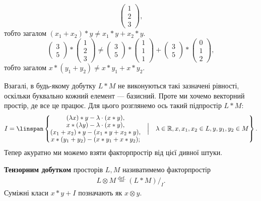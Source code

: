 \documentclass{math_library}
\begin{document}
\begin{example}
\[\begin{pmatrix}
1 \\ 2 \\ 3
\end{pmatrix},
\]
тобто загалом $(x_1+x_2)*y \neq x_1*y + x_2*y$.
\[
\begin{pmatrix}
3 \\ 5
\end{pmatrix} * \begin{pmatrix}
1 \\ 2 \\ 3
\end{pmatrix} \neq \begin{pmatrix}
3 \\ 5
\end{pmatrix} * \begin{pmatrix}
1 \\ 1 \\ 1
\end{pmatrix} + \begin{pmatrix}
3 \\ 5
\end{pmatrix} * \begin{pmatrix}
0 \\ 1 \\ 2
\end{pmatrix},
\]
тобто загалом $x*(y_1+y_2) \neq x*y_1 + x*y_2$.
\end{example}
\noindent
Взагалі, в будь-якому добутку $L*M$ не виконуються такі зазначені рівності, оскільки буквально кожний елемент --- базисний. Проте ми хочемо векторний простір, де все це працює. Для цього розглянемо ось такий підпростір $L*M$:
\begin{align*}
I = \linspan\left\{ \substack{ \textstyle (\lambda x)*y - \lambda \cdot (x*y), \\ \textstyle x*(\lambda y) - \lambda \cdot (x*y), \\ \textstyle (x_1+x_2)*y - (x_1*y + x_2*y), \\ \textstyle x*(y_1+y_2) - (x*y_1 + x*y_2); } \quad \Big| \quad \lambda \in \mathbb{R}, x,x_1,x_2 \in L, y,y_1,y_2 \in M  \right\}.
\end{align*}
Тепер акуратно ми можемо взяти факторпростір від цієї дивної штуки.

\begin{definition}
\textbf{Тензорним добутком} просторів $L,M$ називатимемо факторпростір
\begin{align*}
L \otimes M \overset{\text{def.}}{=} (L*M)/_I.
\end{align*}
Суміжні класи $x*y+I$ позначають як $x \otimes y$.
\end{definition}
\end{document}
